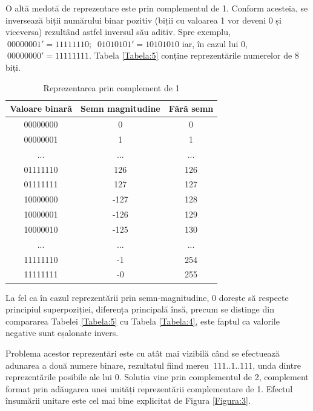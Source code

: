 \documentclass[12pt]{article}
\begin{document}
O altă medotă de reprezentare este prin complementul de 1. Conform acesteia, se inversează biții numărului binar pozitiv (biții cu valoarea 1 vor deveni 0 și viceversa) rezultând astfel inversul său aditiv. Spre exemplu, $\ 00000001' = 11111110;$ $\ 01010101' = 10101010$ iar, în cazul lui 0, $\ 00000000' = 11111111$. Tabela \ref{Tabela:5} conține reprezentările numerelor de 8 biți.
\begin{table}[h]
\centering
\caption{Reprezentarea prin complement de 1 }
\label{Tabela:6}
\begin{tabular}{ ||c|c|c|| }
 \hline
 Valoare binară & Semn magnitudine &  Fără semn\\ 
 \hline  \hline
 00000000 & 0 & 0\\
 \hline
 00000001 & 1  & 1\\
 \hline
  ... &  ... & ... \\
 \hline
 01111110 & 126 & 126 \\
 \hline
 01111111 & 127 & 127 \\
 \hline
 10000000 & -127 & 128 \\
 \hline
 10000001 & -126 & 129 \\
 \hline
 10000010 & -125 & 130 \\
 \hline
   ... &  ... & ... \\
 \hline
 11111110 & -1 & 254 \\
 \hline
 11111111 & -0 & 255 \\
 \hline
\end{tabular}
\end{table}

La fel ca în cazul reprezentării prin semn-magnitudine, 0 dorește să respecte principiul superpoziției, diferența principală însă, precum se distinge din compararea Tabelei \ref{Tabela:5} cu  Tabela \ref{Tabela:4}, este faptul ca valorile negative sunt eșalonate invers.

Problema acestor reprezentări este cu atât mai vizibilă când se efectuează adunarea a două numere binare, rezultatul fiind mereu $\ 111..1..111$, unda dintre reprezentările posibile ale lui 0. Soluția vine prin complementul de 2, complement format prin adăugarea unei unități reprezentării complementare de 1. Efectul însumării unitare este cel mai bine explicitat de Figura \ref{Figura:3}.
 
\end{document}

